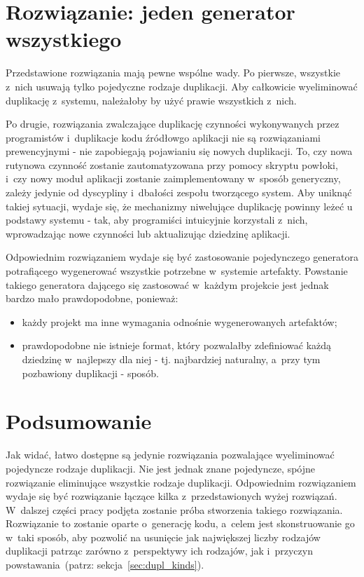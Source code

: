 \section{Rozwiązanie: jeden generator wszystkiego}

Przedstawione rozwiązania mają pewne wspólne wady.
Po pierwsze, wszystkie z~nich usuwają tylko pojedyczne rodzaje duplikacji.
Aby całkowicie wyeliminować duplikację z~systemu, należałoby by użyć prawie wszystkich z~nich.

Po drugie, rozwiązania zwalczające duplikację czynności wykonywanych przez programistów i~duplikacje kodu źródłowgo aplikacji nie są rozwiązaniami prewencyjnymi - nie zapobiegają pojawianiu się nowych duplikacji.
To, czy nowa rutynowa czynność zostanie zautomatyzowana przy pomocy skryptu powłoki, i~czy nowy moduł aplikacji zostanie zaimplementowany w~sposób generyczny, zależy jedynie od dyscypliny i~dbałości zespołu tworzącego system.
Aby uniknąć takiej sytuacji, wydaje się, że mechanizmy niwelujące duplikację powinny leżeć u podstawy systemu - tak, aby programiści intuicyjnie korzystali z~nich, wprowadzając nowe czynności lub aktualizując dziedzinę aplikacji.

Odpowiednim rozwiązaniem wydaje się być zastosowanie pojedynczego generatora potrafiącego wygenerować wszystkie potrzebne w~systemie artefakty.
Powstanie takiego generatora dającego się zastosować w~każdym projekcie jest jednak bardzo mało prawdopodobne, ponieważ:

\begin{itemize}
 \item każdy projekt ma inne wymagania odnośnie wygenerowanych artefaktów;
 \item prawdopodobne nie istnieje format, który pozwalałby zdefiniować każdą dziedzinę w~najlepszy dla niej - tj. najbardziej naturalny, a~przy tym pozbawiony duplikacji - sposób.
\end{itemize}



\section{Podsumowanie}

Jak widać, łatwo dostępne są jedynie rozwiązania pozwalające wyeliminować pojedyncze rodzaje duplikacji.
Nie jest jednak znane pojedyncze, spójne rozwiązanie eliminujące wszystkie rodzaje duplikacji.
Odpowiednim rozwiązaniem wydaje się być rozwiązanie łączące kilka z~przedstawionych wyżej rozwiązań.
W~dalszej części pracy podjęta zostanie próba stworzenia takiego rozwiązania.
Rozwiązanie to zostanie oparte o~generację kodu, a~celem jest skonstruowanie go w~taki sposób, aby pozwolić na usunięcie jak największej liczby rodzajów duplikacji patrząc zarówno z~perspektywy ich rodzajów, jak i~przyczyn powstawania~(patrz: sekcja~\ref{sec:dupl_kinds}).
